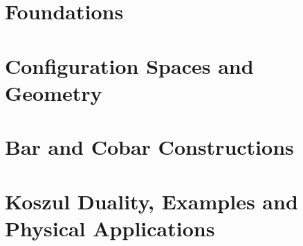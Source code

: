 \documentclass[11pt]{article}
\begin{document}
\part{Foundations}



\part{Configuration Spaces and Geometry}




\part{Bar and Cobar Constructions}






\part{Koszul Duality, Examples and Physical Applications}






\appendix




\end{document}
